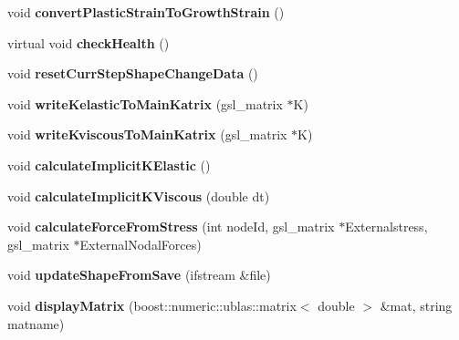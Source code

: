 \begin{DoxyCompactItemize}
\item 
\hypertarget{classShapeBase_a78d45ea18373ce5e21b7567e9e6bdabc}{}void {\bfseries convert\+Plastic\+Strain\+To\+Growth\+Strain} ()\label{classShapeBase_a78d45ea18373ce5e21b7567e9e6bdabc}

\item 
\hypertarget{classShapeBase_adb6927dd05e3f6aa1c5ac5d32a30b5da}{}virtual void {\bfseries check\+Health} ()\label{classShapeBase_adb6927dd05e3f6aa1c5ac5d32a30b5da}

\item 
\hypertarget{classShapeBase_a3c08833714950163efbf15f9b1c26765}{}void {\bfseries reset\+Curr\+Step\+Shape\+Change\+Data} ()\label{classShapeBase_a3c08833714950163efbf15f9b1c26765}

\item 
\hypertarget{classShapeBase_a2bfdde187477364a5a0e2220ea6b2e0e}{}void {\bfseries write\+Kelastic\+To\+Main\+Katrix} (gsl\+\_\+matrix $\ast$K)\label{classShapeBase_a2bfdde187477364a5a0e2220ea6b2e0e}

\item 
\hypertarget{classShapeBase_a388d38c2d6588c7ddf622f1deed53853}{}void {\bfseries write\+Kviscous\+To\+Main\+Katrix} (gsl\+\_\+matrix $\ast$K)\label{classShapeBase_a388d38c2d6588c7ddf622f1deed53853}

\item 
\hypertarget{classShapeBase_a922c41864d4826725cc72089046f818c}{}void {\bfseries calculate\+Implicit\+K\+Elastic} ()\label{classShapeBase_a922c41864d4826725cc72089046f818c}

\item 
\hypertarget{classShapeBase_ac239aba1d2778cd3353bdab964396de8}{}void {\bfseries calculate\+Implicit\+K\+Viscous} (double dt)\label{classShapeBase_ac239aba1d2778cd3353bdab964396de8}

\item 
\hypertarget{classShapeBase_a6a9f16ddb320974584323d78ca4aec9c}{}void {\bfseries calculate\+Force\+From\+Stress} (int node\+Id, gsl\+\_\+matrix $\ast$Externalstress, gsl\+\_\+matrix $\ast$External\+Nodal\+Forces)\label{classShapeBase_a6a9f16ddb320974584323d78ca4aec9c}

\item 
\hypertarget{classShapeBase_ae5a4fc509efc12d24cf90ea71dee3c27}{}void {\bfseries update\+Shape\+From\+Save} (ifstream \&file)\label{classShapeBase_ae5a4fc509efc12d24cf90ea71dee3c27}

\item 
\hypertarget{classShapeBase_a488d30bfef98b1f1786d8d2b8ec17b99}{}void {\bfseries display\+Matrix} (boost\+::numeric\+::ublas\+::matrix$<$ double $>$ \&mat, string matname)\label{classShapeBase_a488d30bfef98b1f1786d8d2b8ec17b99}


\end{DoxyCompactItemize}
